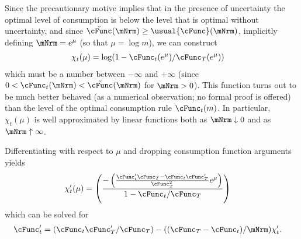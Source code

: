 \documentclass[\econtexRoot/BufferStockTheory]{subfiles}
\begin{document}
Since the precautionary motive implies that in the presence of
uncertainty the optimal level of consumption is below the level that is
optimal without uncertainty, and since $\breve{\cFunc}(\mNrm) \geq \usual{\cFunc}(\mNrm)$,
implicitly defining $\mNrm = e^{\mu}$ (so that $\mu = \log m$), we can construct
\begin{equation}\begin{gathered}\begin{aligned}
 \chi_{t}(\mu)  & = \log (1-\cFunc_{t}(e^{\mu})/\cFunc_{T}(e^{\mu}))  \label{eq:ChiDef}
\end{aligned}\end{gathered}\end{equation}
which must be a number between $-\infty$ and $+\infty$ (since $0 < \cFunc_{t}(\mNrm) < \breve{\cFunc}(\mNrm)$ for $\mNrm > 0$).
This function turns out to be much better behaved (as
a numerical observation; no formal proof is offered) than the level of the optimal consumption rule $\cFunc_{t}(m)$.
In particular, $\chi_{t}(\mu)$ is well approximated by linear functions both as $\mNrm \downarrow 0$ and as $\mNrm \uparrow \infty$.

Differentiating with respect to $\mu$ and dropping consumption function arguments
yields
\begin{equation}\begin{gathered}\begin{aligned}
 \chi^{\prime}_{t}(\mu)  & = \left(\frac{-\left(\frac{\cFunc^{\prime}_{t}\cFunc_{T}-\cFunc_{t}\cFunc_{T}^{\prime}}{\cFunc_{T}^{2}}e^{\mu}\right)}{1-\cFunc_{t}/\cFunc_{T}}\right) \label{eq:ChiPDef}
\end{aligned}\end{gathered}\end{equation}
which can be solved for
\begin{equation}\begin{gathered}\begin{aligned}
 \cFunc^{\prime}_{t}  & = (\cFunc_{t}\cFunc_{T}^{\prime}/\cFunc_{T})-((\cFunc_{T}-\cFunc_{t})/\mNrm)\chi^{\prime}_{t} \label{eq:cFuncPFromChi}.
\end{aligned}\end{gathered}\end{equation}
\end{document}
